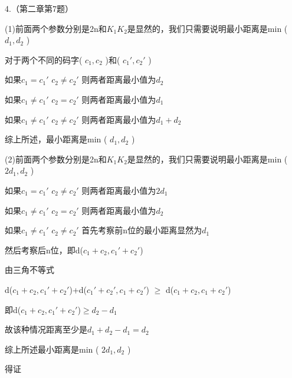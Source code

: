 \documentclass{ctexart}
\begin{document}
	4.（第二章第7题）
	
	(1)前面两个参数分别是2n和$K_1K_2$是显然的，我们只需要说明最小距离是min ( $d_1,d_2$ )
	
	对于两个不同的码字( $c_1,c_2$ )和( $c_1',c_2'$ )
	
	如果$c_1=c_1'$ $c_2 \neq c_2'$ 则两者距离最小值为$d_2$
	
	如果$c_1 \neq c_1'$ $c_2 = c_2'$ 则两者距离最小值为$d_1$
	
	如果$c_1 \neq c_1'$ $c_2 \neq c_2'$ 则两者距离最小值为$d_1+d_2$
	
	综上所述，最小距离是min ( $d_1,d_2$ )
	
	(2)前面两个参数分别是2n和$K_1K_2$是显然的，我们只需要说明最小距离是min ( $2d_1,d_2$ )
	
	如果$c_1=c_1'$ $c_2 \neq c_2'$ 则两者距离最小值为$2d_1$
	
	如果$c_1 \neq c_1'$ $c_2 = c_2'$ 则两者距离最小值为$d_2$
	
	如果$c_1 \neq c_1'$ $c_2 \neq c_2'$ 首先考察前n位的最小距离显然为$d_1$
	
	然后考察后n位，即d($c_1 +c_2,c_1' +c_2'$)
	
	由三角不等式
	
	d($c_1 +c_2,c_1' +c_2'$)+d($c_1' +c_2',c_1 +c_2'$)
	$\geq$ d($c_1 +c_2,c_1 +c_2'$)
	
	即d($c_1 +c_2,c_1' +c_2'$)$\geq$$d_2-d_1$
	
	故该种情况距离至少是$d_1+d_2-d_1=d_2$
	
	综上所述最小距离是min ( $2d_1,d_2$ )
	
	得证
	
\end{document}
